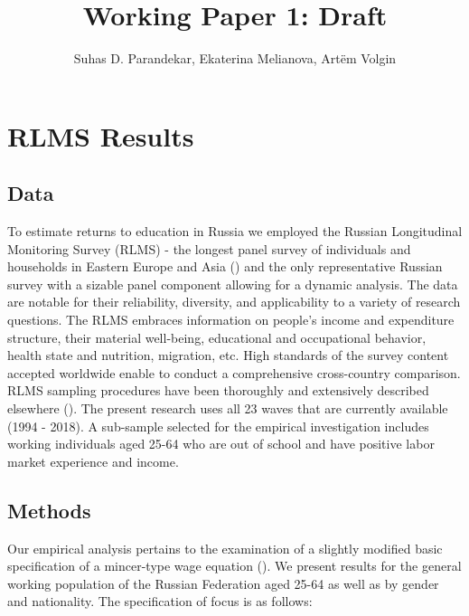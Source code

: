 \documentclass[12pt,a4paper]{article}
\begin{document}


\title{Working Paper 1: Draft}
\author{Suhas D. Parandekar, Ekaterina Melianova, Art\"{e}m Volgin}
\maketitle




\section*{RLMS Results}

\subsection*{Data}

To estimate returns to education in Russia we employed the Russian Longitudinal Monitoring Survey (RLMS) - the longest panel survey of individuals and households in Eastern Europe and Asia (\cite{kozyreva_081._2015}) and the only representative Russian survey with a sizable panel component allowing for a dynamic analysis. The data are notable for their reliability, diversity, and applicability to a variety of research questions. The RLMS embraces information on people's income and expenditure structure, their material well-being, educational and occupational behavior, health state and nutrition, migration, etc. High standards of the survey content accepted worldwide enable to conduct a comprehensive cross-country comparison. RLMS sampling procedures have been thoroughly and extensively described elsewhere (\cite{kozyreva_081._2015}). The present research uses all 23 waves that are currently available (1994 - 2018). A sub-sample selected for the empirical investigation includes working individuals aged 25-64 who are out of school and have positive labor market experience and income.
\\

\subsection*{Methods}

Our empirical analysis pertains to the examination of a slightly modified basic specification of a mincer-type wage equation (\cite{mincer_082._1974}). We present results for the general working population of the Russian Federation aged 25-64 as well as by gender and nationality. The specification of focus is as follows:
\end{document}
